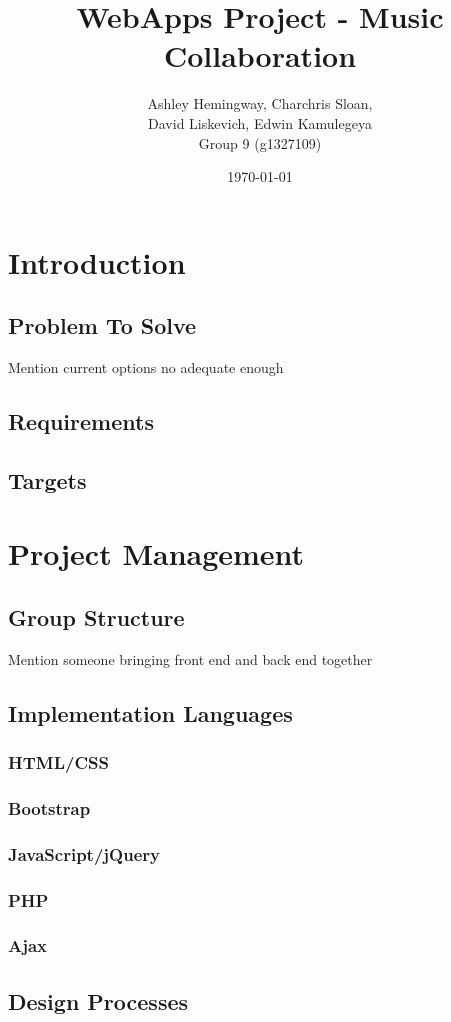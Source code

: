 \documentclass{article}
\title{WebApps Project - Music Collaboration}
\author{Ashley Hemingway, Charchris Sloan, \\ David Liskevich, Edwin Kamulegeya \\ Group 9 (g1327109)}
\date{\today}
\begin{document}
\maketitle

\section{Introduction}
\subsection{Problem To Solve}
Mention current options no adequate enough
\subsection{Requirements}
\subsection{Targets}

\section{Project Management}
\subsection{Group Structure}
Mention someone bringing front end and back end together
\subsection{Implementation Languages}
\subsubsection{HTML/CSS}
\subsubsection{Bootstrap}
\subsubsection{JavaScript/jQuery}
\subsubsection{PHP}
\subsubsection{Ajax}
\subsection{Design Processes}
\end{document}

